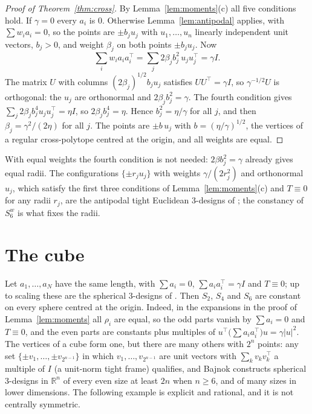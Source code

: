 \documentclass[11pt]{article}
\theoremstyle{remark}
\begin{document}
\begin{proof}[Proof of Theorem~\ref{thm:cross}]
By Lemma~\ref{lem:moments}(c) all five conditions hold. If $\gamma=0$ every $a_i$ is $0$. Otherwise Lemma~\ref{lem:antipodal} applies, with $\sum w_ia_i=0$, so the points are $\pm b_ju_j$ with $u_1,\dots,u_n$ linearly independent unit vectors, $b_j>0$, and weight $\beta_j$ on both points $\pm b_ju_j$. Now
\[
\sum_iw_ia_ia_i^{\top}=\sum_j2\beta_jb_j^2\,u_ju_j^{\top}=\gamma I .
\]
The matrix $U$ with columns $(2\beta_j)^{1/2}b_ju_j$ satisfies $UU^{\top}=\gamma I$, so $\gamma^{-1/2}U$ is orthogonal: the $u_j$ are orthonormal and $2\beta_jb_j^2=\gamma$. The fourth condition gives $\sum_j2\beta_jb_j^4u_ju_j^{\top}=\eta I$, so $2\beta_jb_j^4=\eta$. Hence $b_j^2=\eta/\gamma$ for all $j$, and then $\beta_j=\gamma^2/(2\eta)$ for all $j$. The points are $\pm b\,u_j$ with $b=(\eta/\gamma)^{1/2}$, the vertices of a regular cross-polytope centred at the origin, and all weights are equal.
\end{proof}

With equal weights the fourth condition is not needed: $2\beta b_j^2=\gamma$ already gives equal radii. The configurations $\{\pm r_ju_j\}$ with weights $\gamma/(2r_j^2)$ and orthonormal $u_j$, which satisfy the first three conditions of Lemma~\ref{lem:moments}(c) and $T\equiv0$ for any radii $r_j$, are the antipodal tight Euclidean $3$-designs of \cite[Theorem~1.5]{EtBannai}; the constancy of $S^w_6$ is what fixes the radii.

\section{The cube}\label{sec:cube}

Let $a_1,\dots,a_N$ have the same length, with $\sum a_i=0$, $\sum a_ia_i^{\top}=\gamma I$ and $T\equiv0$; up to scaling these are the spherical $3$-designs of \cite{DGS}. Then $S_2$, $S_4$ and $S_6$ are constant on every sphere centred at the origin. Indeed, in the expansions in the proof of Lemma~\ref{lem:moments} all $\rho_i$ are equal, so the odd parts vanish by $\sum a_i=0$ and $T\equiv0$, and the even parts are constants plus multiples of $u^{\top}\bigl(\sum a_ia_i^{\top}\bigr)u=\gamma|u|^2$. The vertices of a cube form one, but there are many others with $2^n$ points: any set $\{\pm v_1,\dots,\pm v_{2^{n-1}}\}$ in which $v_1,\dots,v_{2^{n-1}}$ are unit vectors with $\sum_kv_kv_k^{\top}$ a multiple of $I$ (a unit-norm tight frame) qualifies, and Bajnok \cite{Bajnok} constructs spherical $3$-designs in $\mathbb{R}^n$ of every even size at least $2n$ when $n\ge6$, and of many sizes in lower dimensions. The following example is explicit and rational, and it is not centrally symmetric.
\end{document}
